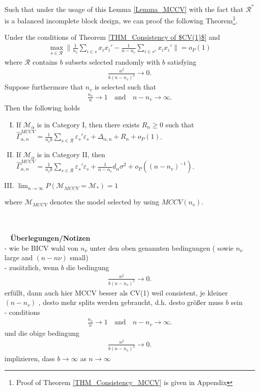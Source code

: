 \documentclass[Research_Module_ES.tex]{subfiles}
\begin{document}
Such that under the usage of this Lemma \ref{Lemma_MCCV} with the fact that $\mathcal{R}^\ast$ is a balanced incomplete block design, we can proof the following  Theorem\footnote{Proof of Theorem \ref{THM_Consistency_MCCV} is given in Appendix }. 


\begin{thm}
\label{THM_Consistency_MCCV}
Under the conditions of Theorem \ref{THM_Consistency of $CV(1)$} and
\begin{align*}
\max_{s\in \mathcal{R}}\biggl\lVert \frac{1}{n_v}\sum_{i\in s}x_ix_i' - \frac{1}{n-n_v}\sum_{i\in s^c}x_ix_i'\biggr\rVert =o_P(1)
\end{align*}
where $\mathcal{R}$ contains $b$ subsets selected randomly with $b$ satisfying
\begin{align*}
\frac{n^2}{b(n-n_v)^2}\to 0.
\end{align*}
Suppose furthermore that $n_v$ is selected such that
\begin{align}
\frac{n_v}{n}\to 1 \quad \textrm{and} \quad n-n_v \to \infty.\label{growth_rates_nv_MCCV}
\end{align}
Then the following holds
\begin{enumerate}[(I)]
\item If $\mathcal{M}_\alpha$ is in Category I, then there exists $R_n \ge 0$ such that $\hat{\Gamma}_{\alpha,n}^{MCCV} = \frac{1}{n_vb}\sum_{s\in \mathcal{R}}\varepsilon_s'\varepsilon_s + \Delta_{\alpha,n} + R_n + o_P(1)$.
\item If $\mathcal{M}_\alpha$ is in Category II, then $\hat{\Gamma}_{\alpha,n}^{MCCV} = \frac{1}{n_vb}\sum_{s\in \mathcal{R}}\varepsilon_s'\varepsilon_s + \frac{1}{n-n_v}d_\alpha\sigma^2  + o_P((n-n_v)^{-1})$.
\item $\lim_{n\to\infty}P(\mathcal{M}_{MCCV}=\mathcal{M}_\ast) = 1$
\end{enumerate}
where $\mathcal{M}_{MCCV}$ denotes the model selected by using $MCCV(n_v)$.
\end{thm}

~\\\\~
\textbf{Überlegungen/Notizen}\\
- wie be BICV wahl von $n_\nu$ unter den oben genannten bedingungen ( sowie $n_\nu$ large and $(n-n\nu)$ small)\\
- zusätzlich, wenn $b$ die bedingung \begin{align*}
\frac{n^2}{b(n-n_v)^2}\to 0.
\end{align*}
erfüllt, dann auch hier MCCV besser als CV(1) weil consistent, je kleiner $(n-n_v)$ , desto mehr splits werden gebraucht, d.h. desto größer muss $b$ sein\\
- conditions
\begin{align*}
\frac{n_v}{n}\to 1 \quad \textrm{and} \quad n-n_v \to \infty.
\end{align*}
 und die obige bedingung 
 \begin{align*}
 \frac{n^2}{b(n-n_v)^2}\to 0.
 \end{align*}
 implizieren, dass $b\to \infty$ as $n\to\infty$
\end{document}
